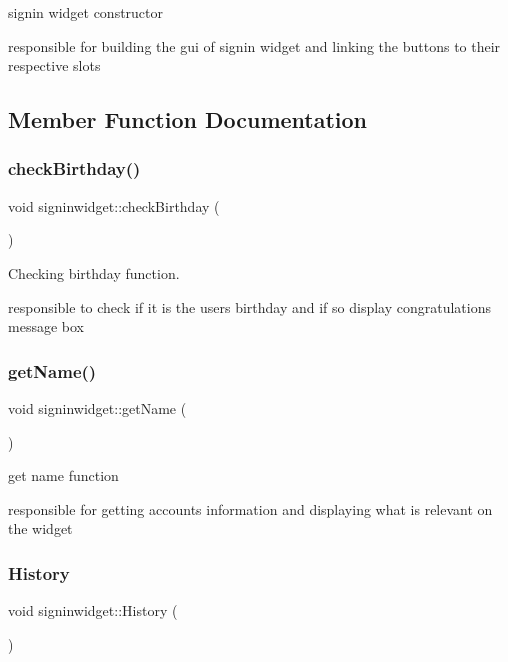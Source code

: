 signin widget constructor 

responsible for building the gui of signin widget and linking the buttons to their respective slots 

\subsection{Member Function Documentation}
\mbox{\label{classsigninwidget_a224d1d91ae499107379f886fbd9bec88}} 
\subsubsection{\texorpdfstring{check\+Birthday()}{checkBirthday()}}
{\footnotesize\ttfamily void signinwidget\+::check\+Birthday (\begin{DoxyParamCaption}{ }\end{DoxyParamCaption})}



Checking birthday function. 

responsible to check if it is the user\textquotesingle{}s birthday and if so display congratulations message box \mbox{\label{classsigninwidget_a718e8f00822a5386e064765def03d4a7}} 
\subsubsection{\texorpdfstring{get\+Name()}{getName()}}
{\footnotesize\ttfamily void signinwidget\+::get\+Name (\begin{DoxyParamCaption}{ }\end{DoxyParamCaption})}



get name function 

responsible for getting accounts information and displaying what is relevant on the widget \mbox{\label{classsigninwidget_ad65d01b8dfc345ec25de223a989fd074}} 
\subsubsection{\texorpdfstring{History}{History}}
{\footnotesize\ttfamily void signinwidget\+::\+History (\begin{DoxyParamCaption}{ }\end{DoxyParamCaption})\hspace{0.3cm}{\ttfamily [slot]}}



